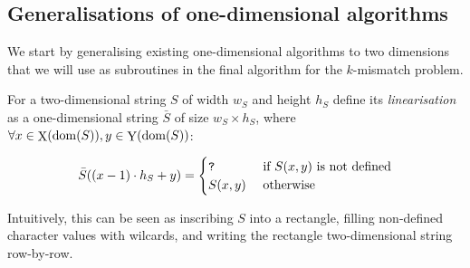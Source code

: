 \documentclass[11pt, letterpaper]{article}
\theoremstyle{plain}
\theoremstyle{definition}
\theoremstyle{remark}
\DeclareMathOperator*{\X}{X}
\DeclareMathOperator*{\Y}{Y}
\begin{document}
\subsection{Generalisations of one-dimensional algorithms}
We start by generalising existing one-dimensional algorithms to two dimensions that we will use as subroutines in the final algorithm for the $k$-mismatch problem. 

For a two-dimensional string $S$ of width $w_S$ and height $h_S$ define its \emph{linearisation} as a one-dimensional string $\bar{S}$ of size $w_S \times h_S$, where $\forall x \in \X(\d{S}), y \in \Y(\d{S})$:

$$
\bar{S}((x-1) \cdot h_S + y) =
\begin{cases}
\texttt{?} & \text{ if } S(x,y) \text{ is not defined}\\
S(x,y) & \text{ otherwise}
\end{cases}
$$

Intuitively, this can be seen as inscribing $S$ into a rectangle, filling non-defined character values with wilcards, and writing the rectangle two-dimensional string row-by-row. 
\end{document}
